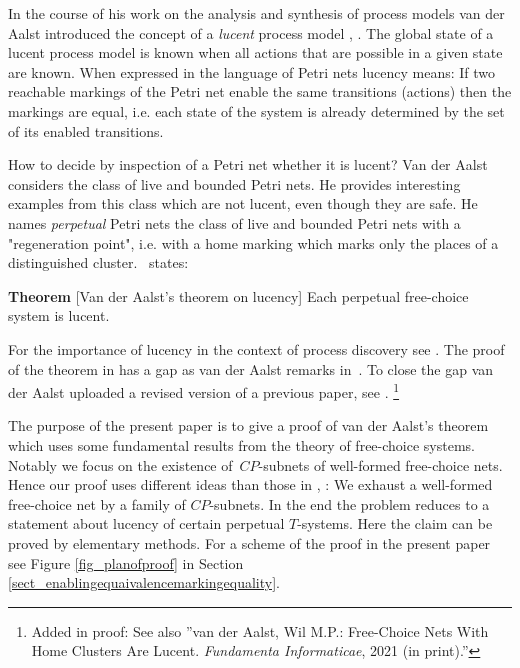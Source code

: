 \documentclass{fundam}
\begin{document}
In the course of his work on the analysis and synthesis of process models van der Aalst introduced the concept of a \emph{lucent} process model \cite{Aal2018},  \cite{Aal2019}. The global state of a lucent process model is known when all actions that are possible in a given state are known. When expressed in the language of Petri nets lucency means: If two reachable markings of the Petri net enable the same transitions (actions) then the markings are equal, i.e. each state of the system is already determined by the set of its enabled transitions.

How to decide by inspection of a Petri net whether it is lucent? Van der Aalst considers the class of live and bounded Petri nets. He provides interesting examples from this class which are not lucent, even though they are safe. He names \emph{perpetual} Petri nets the class of live and bounded Petri nets with a "regeneration point", i.e. with a home marking which marks only the places of a distinguished \mbox{cluster. \cite[Theor. 3]{Aal2018}} states:
\begin{flushleft}\textbf{Theorem} [Van der Aalst's theorem on lucency]\label{theor_vanaalsttheorem}
Each perpetual free-choice system is lucent.
\end{flushleft}\bigskip
For the importance of lucency in the context of process discovery see \cite{Aal2019}. The proof of the theorem in \cite{Aal2018} has a gap as van der Aalst remarks \mbox{in \cite{Aal}}. To close the gap van der Aalst uploaded a revised version of a previous paper, see \cite[Theor. 3]{Aal2020}.
\footnote{Added in proof: See also ''van der Aalst, Wil M.P.: Free-Choice Nets With Home Clusters Are Lucent. \emph{Fundamenta Informaticae}, 2021 (in print).''}\bigskip

The purpose of the present paper is to give a proof of van der Aalst's theorem which uses some fundamental results from the theory of free-choice systems. Notably we focus on the existence \mbox{of $CP$-subnets} of well-formed free-choice nets. Hence our proof uses different ideas than those in \cite{Aal2018}, \cite{Aal2020}: We exhaust a well-formed free-choice net by a family of $CP$-subnets. In the end the problem reduces to a statement about lucency of certain perpetual $T$-systems. Here the claim can be proved by elementary methods. For a scheme of the proof in the present paper see Figure \ref{fig_planofproof} in Section \ref{sect_enablingequaivalencemarkingequality}.

\end{document}
